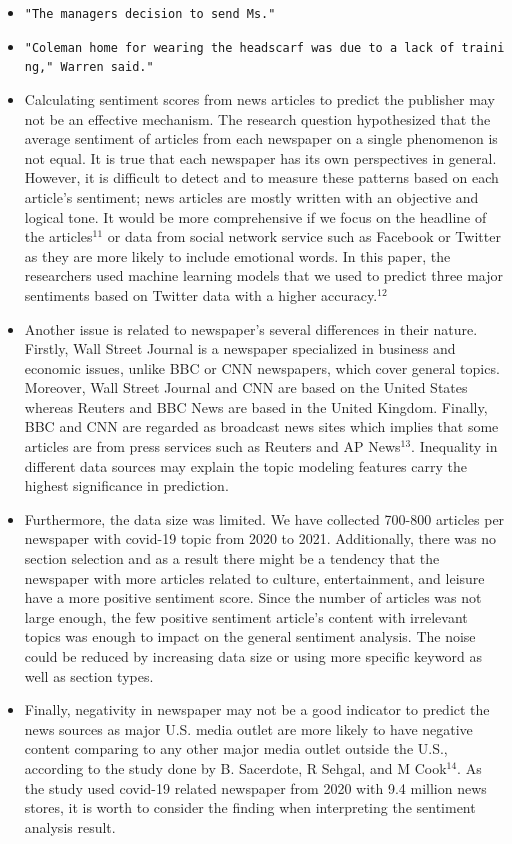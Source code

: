 \documentclass[
]{article}
\begin{document}
\begin{itemize}
\item
  \texttt{"The\ manager\textquotesingle{}s\ decision\ to\ send\ Ms."}
\item
  \texttt{"Coleman\ home\ for\ wearing\ the\ headscarf\ was\ due\ to\ a\ lack\ of\ training,"\ Warren\ said."}
\item
  Calculating sentiment scores from news articles to predict the
  publisher may not be an effective mechanism. The research question
  hypothesized that the average sentiment of articles from each
  newspaper on a single phenomenon is not equal. It is true that each
  newspaper has its own perspectives in general. However, it is
  difficult to detect and to measure these patterns based on each
  article's sentiment; news articles are mostly written with an
  objective and logical tone. It would be more comprehensive if we focus
  on the headline of the articles\(^{11}\) or data from social network
  service such as Facebook or Twitter as they are more likely to include
  emotional words. In this paper, the researchers used machine learning
  models that we used to predict three major sentiments based on Twitter
  data with a higher accuracy.\(^{12}\)
\item
  Another issue is related to newspaper's several differences in their
  nature. Firstly, Wall Street Journal is a newspaper specialized in
  business and economic issues, unlike BBC or CNN newspapers, which
  cover general topics. Moreover, Wall Street Journal and CNN are based
  on the United States whereas Reuters and BBC News are based in the
  United Kingdom. Finally, BBC and CNN are regarded as broadcast news
  sites which implies that some articles are from press services such as
  Reuters and AP News\(^{13}\). Inequality in different data sources may
  explain the topic modeling features carry the highest significance in
  prediction.
\item
  Furthermore, the data size was limited. We have collected 700-800
  articles per newspaper with covid-19 topic from 2020 to 2021.
  Additionally, there was no section selection and as a result there
  might be a tendency that the newspaper with more articles related to
  culture, entertainment, and leisure have a more positive sentiment
  score. Since the number of articles was not large enough, the few
  positive sentiment article's content with irrelevant topics was enough
  to impact on the general sentiment analysis. The noise could be
  reduced by increasing data size or using more specific keyword as well
  as section types.
\item
  Finally, negativity in newspaper may not be a good indicator to
  predict the news sources as major U.S. media outlet are more likely to
  have negative content comparing to any other major media outlet
  outside the U.S., according to the study done by B. Sacerdote, R
  Sehgal, and M Cook\(^{14}\). As the study used covid-19 related
  newspaper from 2020 with 9.4 million news stores, it is worth to
  consider the finding when interpreting the sentiment analysis result.
\end{itemize}
\end{document}
